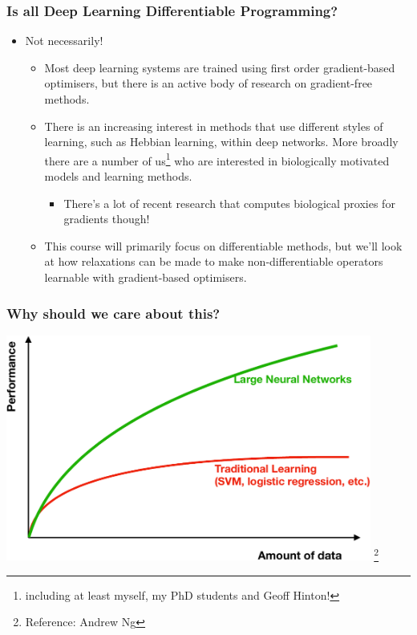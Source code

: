 \documentclass[\beamerclass]{beamer}
\newcommand\blfootnote[1]{%
  \begingroup
  \renewcommand\thefootnote{}\footnote{#1}%
  \addtocounter{footnote}{-1}%
  \endgroup
}
\begin{document}
\begin{frame}
\frametitle{Is all Deep Learning Differentiable Programming?}
\begin{itemize}
	\item Not necessarily!
	\begin{itemize}
		\item<+-> Most deep learning systems are trained using first order gradient-based optimisers, but there is an active body of research on gradient-free methods.
		\item<+-> There is an increasing interest in methods that use different styles of learning, such as Hebbian learning, within deep networks. More broadly there are a number of us\footnote{including at least myself, my PhD students and Geoff Hinton!} who are interested in biologically motivated models and learning methods.
		\begin{itemize}
			\item<+-> There's a lot of recent research that computes biological proxies for gradients though!
		\end{itemize}

		\item<+-> This course will primarily focus on differentiable methods, but we'll look at how relaxations can be made to make non-differentiable operators learnable with gradient-based optimisers.
	\end{itemize}
\end{itemize}
\end{frame}

\begin{frame}
	\frametitle{Why should we care about this?}
	\centering \includegraphics[width=0.9\textwidth]{Fig1.pdf}\blfootnote{Reference: Andrew Ng}
\end{frame}
\end{document}
